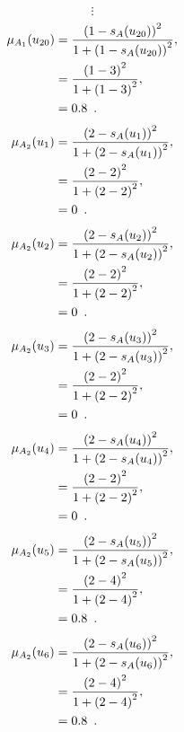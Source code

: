 \documentclass[a4paper,openany]{book}
\begin{document}
				\[
					\vdots
				\]
				\begin{align}
					\mu_{A_1}(u_{20}) &= \frac{\left(1-s_A(u_{20})\right)^2}{1 + \left(1-s_A(u_{20})\right)^2} ,\\
					&= \frac{\left(1-3\right)^2}{1 + \left(1-3\right)^2} \notag ,\\
					&= 0.8 \enspace. \notag
				\end{align}
				\begin{align}
					\mu_{A_2}(u_1) &= \frac{\left(2-s_A(u_1)\right)^2}{1 + \left(2-s_A(u_1)\right)^2} ,\\
					&= \frac{\left(2-2\right)^2}{1 + \left(2-2\right)^2} \notag ,\\
					&= 0 \enspace. \notag
				\end{align}
				\begin{align}
					\mu_{A_2}(u_2) &= \frac{\left(2-s_A(u_2)\right)^2}{1 + \left(2-s_A(u_2)\right)^2} ,\\
					&= \frac{\left(2-2\right)^2}{1 + \left(2-2\right)^2} \notag ,\\
					&= 0 \enspace. \notag
				\end{align}
				\begin{align}
					\mu_{A_2}(u_3) &= \frac{\left(2-s_A(u_3)\right)^2}{1 + \left(2-s_A(u_3)\right)^2} ,\\
					&= \frac{\left(2-2\right)^2}{1 + \left(2-2\right)^2} \notag ,\\
					&= 0 \enspace. \notag
				\end{align}
				\begin{align}
					\mu_{A_2}(u_4) &= \frac{\left(2-s_A(u_4)\right)^2}{1 + \left(2-s_A(u_4)\right)^2} ,\\
					&= \frac{\left(2-2\right)^2}{1 + \left(2-2\right)^2} \notag ,\\
					&= 0 \enspace. \notag
				\end{align}
				\begin{align}
					\mu_{A_2}(u_5) &= \frac{\left(2-s_A(u_5)\right)^2}{1 + \left(2-s_A(u_5)\right)^2} ,\\
					&= \frac{\left(2-4\right)^2}{1 + \left(2-4\right)^2} \notag ,\\
					&= 0.8 \enspace. \notag
				\end{align}
				\begin{align}
					\mu_{A_2}(u_6) &= \frac{\left(2-s_A(u_6)\right)^2}{1 + \left(2-s_A(u_6)\right)^2} ,\\
					&= \frac{\left(2-4\right)^2}{1 + \left(2-4\right)^2} \notag ,\\
					&= 0.8 \enspace. \notag
				\end{align}
\end{document}
